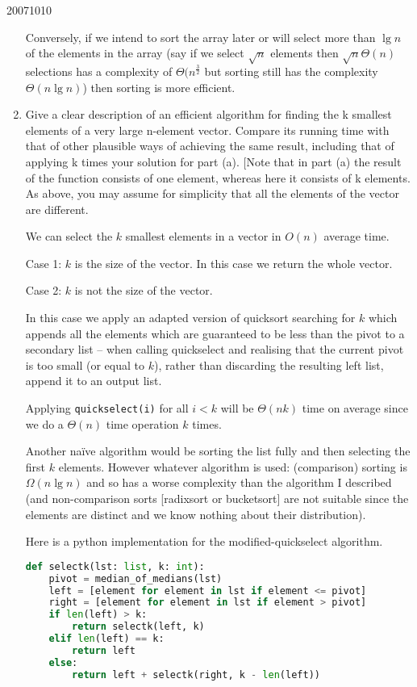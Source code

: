 \documentclass[10pt,\jkfside,a4paper]{article}
\begin{document}
\begin{examquestion}{2007}{10}{10}
\begin{enumerate}
Conversely, if we intend to sort the array later or will select more than $\lg n$ of the elements in the 
array (say if we select $\sqrt{n}$ elements then $\sqrt{n} \Theta(n)$ selections has a complexity of $\Theta(n^{\frac{3}{2}}$ 
but sorting still has the complexity $\Theta(n\lg n)$) then sorting is more efficient.

\item Give a clear description of an efficient algorithm for finding the k smallest
elements of a very large n-element vector. Compare its running time with that
of other plausible ways of achieving the same result, including that of applying
k times your solution for part (a). [Note that in part (a) the result of the
function consists of one element, whereas here it consists of k elements. As
above, you may assume for simplicity that all the elements of the vector are
different.

We can select the $k$ smallest elements in a vector in $O(n)$ average time.

Case 1: $k$ is the size of the vector. In this case we return the whole vector.

Case 2: $k$ is not the size of the vector. 

In this case we apply an adapted version of quicksort searching for $k$ which appends all the elements which are 
guaranteed to be less than the pivot to a secondary list -- when calling quickselect and realising 
that the current pivot is too small (or equal to $k$), rather than discarding the resulting left list, 
append it to an output list.

Applying {\tt quickselect(i)} for all $i < k$ will be $\Theta(nk)$ time on average since we do 
a $\Theta(n)$ time operation $k$ times.

Another na\"ive algorithm would be sorting the list fully and 
then selecting the first $k$ elements. However whatever algorithm is used: (comparison) 
sorting is $\Omega(n \lg n)$ and so has a worse complexity than the algorithm I described (and 
non-comparison sorts [radixsort or bucketsort] are not suitable since the elements are distinct 
and we know nothing about their distribution).

Here is a python implementation for the modified-quickselect algorithm.
\begin{lstlisting}[language=python]
def selectk(lst: list, k: int):
    pivot = median_of_medians(lst)
    left = [element for element in lst if element <= pivot]
    right = [element for element in lst if element > pivot]
    if len(left) > k:
        return selectk(left, k)
    elif len(left) == k:
        return left
    else:
        return left + selectk(right, k - len(left))
\end{lstlisting}


\end{enumerate}
\end{examquestion}
\end{document}
